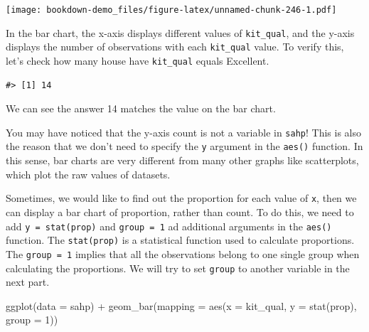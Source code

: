 \documentclass[
]{book}
\newenvironment{Shaded}{\begin{snugshade}}{\end{snugshade}}
\newcommand{\AttributeTok}[1]{\textcolor[rgb]{0.77,0.63,0.00}{#1}}
\newcommand{\DecValTok}[1]{\textcolor[rgb]{0.00,0.00,0.81}{#1}}
\newcommand{\FunctionTok}[1]{\textcolor[rgb]{0.00,0.00,0.00}{#1}}
\newcommand{\NormalTok}[1]{#1}
\newcommand{\SpecialCharTok}[1]{\textcolor[rgb]{0.00,0.00,0.00}{#1}}
\newcommand{\StringTok}[1]{\textcolor[rgb]{0.31,0.60,0.02}{#1}}
\begin{document}
\texttt{[image: bookdown-demo\_files/figure-latex/unnamed-chunk-246-1.pdf]}

In the bar chart, the x-axis displays different values of \texttt{kit\_qual}, and the y-axis displays the number of observations with each \texttt{kit\_qual} value. To verify this, let's check how many house have \texttt{kit\_qual} equals Excellent.

\begin{Shaded}
\end{Shaded}

\begin{verbatim}
#> [1] 14
\end{verbatim}

We can see the answer 14 matches the value on the bar chart.

You may have noticed that the y-axis count is not a variable in \texttt{sahp}! This is also the reason that we don't need to specify the \texttt{y} argument in the \texttt{aes()} function. In this sense, bar charts are very different from many other graphs like scatterplots, which plot the raw values of datasets.

Sometimes, we would like to find out the proportion for each value of \texttt{x}, then we can display a bar chart of proportion, rather than count. To do this, we need to add \texttt{y\ =\ stat(prop)} and \texttt{group\ =\ 1} ad additional arguments in the \texttt{aes()} function. The \texttt{stat(prop)} is a statistical function used to calculate proportions. The \texttt{group\ =\ 1} implies that all the observations belong to one single group when calculating the proportions. We will try to set \texttt{group} to another variable in the next part.

\begin{Shaded}
\begin{Highlighting}[]
\FunctionTok{ggplot}\NormalTok{(}\AttributeTok{data =}\NormalTok{ sahp) }\SpecialCharTok{+} \FunctionTok{geom\_bar}\NormalTok{(}\AttributeTok{mapping =} \FunctionTok{aes}\NormalTok{(}\AttributeTok{x =}\NormalTok{ kit\_qual, }\AttributeTok{y =} \FunctionTok{stat}\NormalTok{(prop), }\AttributeTok{group =} \DecValTok{1}\NormalTok{))}
\end{Highlighting}
\end{Shaded}
\end{document}

